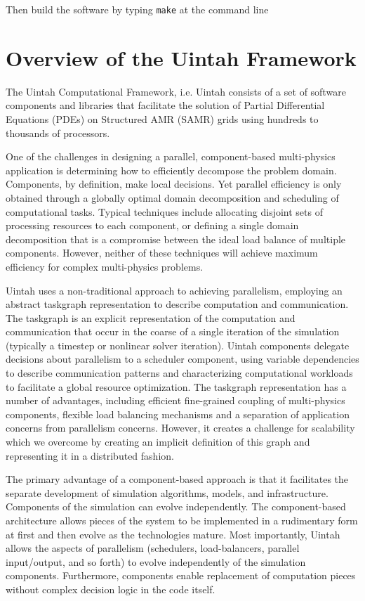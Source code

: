 \documentclass[12pt]{report}
\begin{document}
Then build the software by typing \texttt{make} at the command line


\chapter{Overview of the Uintah Framework}

The Uintah Computational Framework, i.e. Uintah consists of a set of
software components and libraries that facilitate the solution of
Partial Differential Equations (PDEs) on Structured AMR (SAMR) grids
using hundreds to thousands of processors.

One of the challenges in designing a parallel, component-based
multi-physics application is determining how to efficiently decompose
the problem domain. Components, by definition, make local
decisions. Yet parallel efficiency is only obtained through a globally
optimal domain decomposition and scheduling of computational
tasks. Typical techniques include allocating disjoint sets of
processing resources to each component, or defining a single domain
decomposition that is a compromise between the ideal load balance of
multiple components. However, neither of these techniques will achieve
maximum efficiency for complex multi-physics problems.

Uintah uses a non-traditional approach to achieving parallelism,
employing an abstract taskgraph representation to describe computation
and communication. The taskgraph is an explicit representation of the
computation and communication that occur in the coarse of a single
iteration of the simulation (typically a timestep or nonlinear solver
iteration). Uintah components delegate decisions about parallelism to
a scheduler component, using variable dependencies to describe
communication patterns and characterizing computational workloads to
facilitate a global resource optimization. The taskgraph
representation has a number of advantages, including efficient
fine-grained coupling of multi-physics components, flexible load
balancing mechanisms and a separation of application concerns from
parallelism concerns. However, it creates a challenge for scalability
which we overcome by creating an implicit definition of this graph and
representing it in a distributed fashion.

The primary advantage of a component-based approach is that it
facilitates the separate development of simulation algorithms, models,
and infrastructure. Components of the simulation can evolve
independently. The component-based architecture allows pieces of the
system to be implemented in a rudimentary form at first and then
evolve as the technologies mature. Most importantly, Uintah allows the
aspects of parallelism (schedulers, load-balancers, parallel
input/output, and so forth) to evolve independently of the simulation
components. Furthermore, components enable replacement of computation
pieces without complex decision logic in the code itself.
\end{document}
